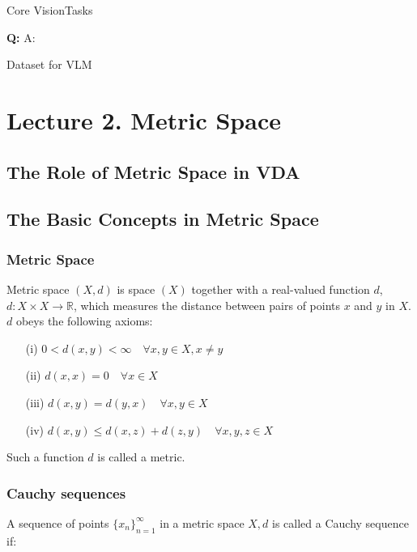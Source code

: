 Core VisionTasks








\textbf{Q: }
A: 











Dataset for VLM

\section{Lecture 2. Metric Space}
\subsection{The Role of Metric Space in VDA}
\subsection{The Basic Concepts in Metric Space}
\pagebreak
\subsubsection{Metric Space}

Metric space $(X, d)$ is space $(X)$ together with a real-valued function \(d\), \(d: X \times X \rightarrow \mathbb{R}\), which measures the distance between pairs of points \(x\) and \(y\) in \(X\).\\
 \(d\) obeys the following axioms:

\begin{itemize}
    \item[(i)] \(0 < d(x, y) < \infty \quad \forall x, y \in X, x \neq y\)
    \item[(ii)] \(d(x, x) = 0 \quad \forall x \in X\)
    \item[(iii)] \(d(x, y) = d(y, x) \quad \forall x, y \in X\)
    \item[(iv)] \(d(x, y) \leq d(x, z) + d(z, y) \quad \forall x, y, z \in X\)
\end{itemize}

Such a function \(d\) is called a metric.

\subsubsection{Cauchy sequences}

A sequence of points \(\{x_n\}_{n=1}^\infty\) in a metric space \(X, d\) is called a Cauchy sequence if:

